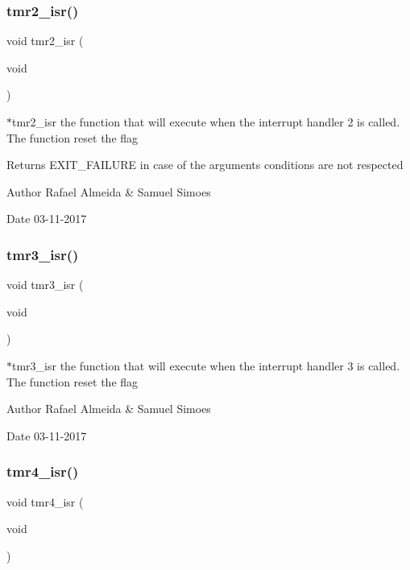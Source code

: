 \subsubsection{tmr2\+\_\+isr()}
{\footnotesize\ttfamily void tmr2\+\_\+isr (\begin{DoxyParamCaption}\item[{void}]{ }\end{DoxyParamCaption})}



$\ast$tmr2\+\_\+isr the function that will execute when the interrupt handler 2 is called. The function reset the flag 

\begin{DoxyReturn}{Returns}
E\+X\+I\+T\+\_\+\+F\+A\+I\+L\+U\+RE in case of the argument\textquotesingle{}s conditions are not respected 
\end{DoxyReturn}
\begin{DoxyAuthor}{Author}
Rafael Almeida \& Samuel Simoes 
\end{DoxyAuthor}
\begin{DoxyDate}{Date}
03-\/11-\/2017 
\end{DoxyDate}
\mbox{\label{timer__libs_8c_adaa8fed7e9977936c99b1989d3aac195}} 
\subsubsection{tmr3\+\_\+isr()}
{\footnotesize\ttfamily void tmr3\+\_\+isr (\begin{DoxyParamCaption}\item[{void}]{ }\end{DoxyParamCaption})}



$\ast$tmr3\+\_\+isr the function that will execute when the interrupt handler 3 is called. The function reset the flag 

\begin{DoxyAuthor}{Author}
Rafael Almeida \& Samuel Simoes 
\end{DoxyAuthor}
\begin{DoxyDate}{Date}
03-\/11-\/2017 
\end{DoxyDate}
\mbox{\label{timer__libs_8c_aeb91f903b0c92b3f81dc57f7e63f45aa}} 
\subsubsection{tmr4\+\_\+isr()}
{\footnotesize\ttfamily void tmr4\+\_\+isr (\begin{DoxyParamCaption}\item[{void}]{ }\end{DoxyParamCaption})}



